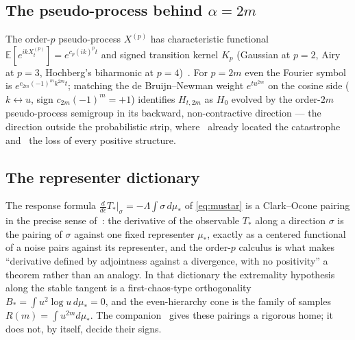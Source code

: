 \documentclass[11pt,reqno]{amsart}
\theoremstyle{plain}
\theoremstyle{definition}
\theoremstyle{remark}
\newcommand{\E}{\mathbb E}
\begin{document}
\subsection{The pseudo-process behind $\alpha=2m$}
The order-$p$ pseudo-process $X^{(p)}$ has characteristic functional
$\E[e^{ikX^{(p)}_t}]=e^{c_p(ik)^pt}$ and signed transition kernel $K_p$
(Gaussian at $p=2$, Airy at $p=3$, Hochberg's biharmonic at
$p=4$)~\cite{Fpseudo}. For $p=2m$ even the Fourier symbol is
$e^{c_{2m}(-1)^mk^{2m}t}$; matching the de Bruijn--Newman weight $e^{tu^{2m}}$
on the cosine side ($k\leftrightarrow u$, sign $c_{2m}(-1)^m=+1$) identifies
$H_{t,2m}$ as $H_0$ evolved by the order-$2m$ pseudo-process semigroup in
its backward, non-contractive direction --- the direction outside the
probabilistic strip, where~\cite{Fsymbol} already located the catastrophe
and~\cite{Fpseudo} the loss of every positive structure.

\subsection{The representer dictionary}
The response formula $\frac{d}{d\epsilon}T_*|_\sigma=-\Lambda\int\sigma\,
d\mu_*$ of \eqref{eq:mustar} is a Clark--Ocone pairing in the precise sense
of~\cite{Fpseudo}: the derivative of the observable $T_*$ along a direction
$\sigma$ is the pairing of $\sigma$ against one fixed representer $\mu_*$,
exactly as a centered functional of a noise pairs against its
representer, and the order-$p$ calculus is what makes ``derivative defined
by adjointness against a divergence, with no positivity'' a theorem rather
than an analogy. In that dictionary the extremality hypothesis along the
stable tangent is a first-chaos-type orthogonality
$B_*=\int u^2\log u\,d\mu_*=0$, and the even-hierarchy cone is the family of
samples $R(m)=\int u^{2m}d\mu_*$. The companion~\cite{Fpseudo} gives these
pairings a rigorous home; it does not, by itself, decide their signs.
\end{document}
